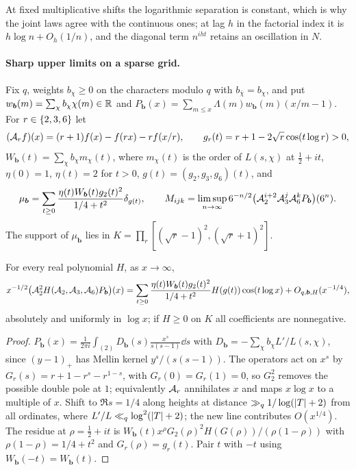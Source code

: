 At fixed multiplicative shifts the logarithmic separation is constant, which is why the joint laws
agree with the continuous ones; at lag $h$ in the factorial index it is $h\log n+O_h(1/n)$, and the
diagonal term $n^{iht}$ retains an oscillation in $N$.

\paragraph{Sharp upper limits on a sparse grid.}
Fix $q$, weights $b_\chi\ge0$ on the characters modulo $q$ with $b_{\bar\chi}=b_\chi$, and put
$w_{\boldsymbol b}(m)=\sum_\chi b_\chi\chi(m)\in\mathbb{R}$ and
$P_{\boldsymbol b}(x)=\sum_{m\le x}\Lambda(m)w_{\boldsymbol b}(m)(x/m-1)$. For $r\in\{2,3,6\}$ let
\[
 (\mathcal{A}_rf)(x)=(r+1)f(x)-f(rx)-rf(x/r),\qquad g_r(t)=r+1-2\sqrt r\cos(t\log r)>0,
\]
$W_{\boldsymbol b}(t)=\sum_\chi b_\chi m_\chi(t)$, where $m_\chi(t)$ is the order of $L(s,\chi)$ at
$\tfrac12+it$, $\eta(0)=1$, $\eta(t)=2$ for $t>0$, $g(t)=(g_2,g_3,g_6)(t)$, and
\[
 \mu_{\boldsymbol b}=\sum_{t\ge0}\frac{\eta(t)W_{\boldsymbol b}(t)g_2(t)^2}{1/4+t^2}\delta_{g(t)},\qquad
 M_{ijk}=\limsup_{n\to\infty}6^{-n/2}\bigl(\mathcal{A}_2^{i+2}\mathcal{A}_3^j\mathcal{A}_6^kP_{\boldsymbol b}\bigr)(6^n).
\]
The support of $\mu_{\boldsymbol b}$ lies in $K=\prod_r[(\sqrt r-1)^2,(\sqrt r+1)^2]$.

\begin{lemma}\label{rec:lem:threescale}
For every real polynomial $H$, as $x\to\infty$,
\[
 x^{-1/2}\bigl(\mathcal{A}_2^2H(\mathcal{A}_2,\mathcal{A}_3,\mathcal{A}_6)P_{\boldsymbol b}\bigr)(x)
 =\sum_{t\ge0}\frac{\eta(t)W_{\boldsymbol b}(t)g_2(t)^2}{1/4+t^2}H(g(t))\cos(t\log x)+O_{q,\boldsymbol b,H}(x^{-1/4}),
\]
absolutely and uniformly in $\log x$; if $H\ge0$ on $K$ all coefficients are nonnegative.
\end{lemma}

\begin{proof}
$P_{\boldsymbol b}(x)=\frac1{2\pi i}\int_{(2)}D_{\boldsymbol b}(s)\frac{x^s}{s(s-1)}\dd s$ with
$D_{\boldsymbol b}=-\sum_\chi b_\chi L'/L(s,\chi)$, since $(y-1)_+$ has Mellin kernel $y^s/(s(s-1))$.
The operators act on $x^s$ by $G_r(s)=r+1-r^s-r^{1-s}$, with $G_r(0)=G_r(1)=0$, so $G_2^2$ removes the
possible double pole at $1$; equivalently $\mathcal{A}_r$ annihilates $x$ and maps $x\log x$ to a multiple
of $x$. Shift to $\Re s=1/4$ along heights at distance $\gg_q1/\log(\lvert T\rvert+2)$ from all ordinates,
where $L'/L\ll_q\log^2(\lvert T\rvert+2)$; the new line contributes $O(x^{1/4})$. The residue at
$\rho=\tfrac12+it$ is $W_{\boldsymbol b}(t)x^\rho G_2(\rho)^2H(G(\rho))/(\rho(1-\rho))$ with
$\rho(1-\rho)=1/4+t^2$ and $G_r(\rho)=g_r(t)$. Pair $t$ with $-t$ using $W_{\boldsymbol b}(-t)=W_{\boldsymbol b}(t)$.
\end{proof}

